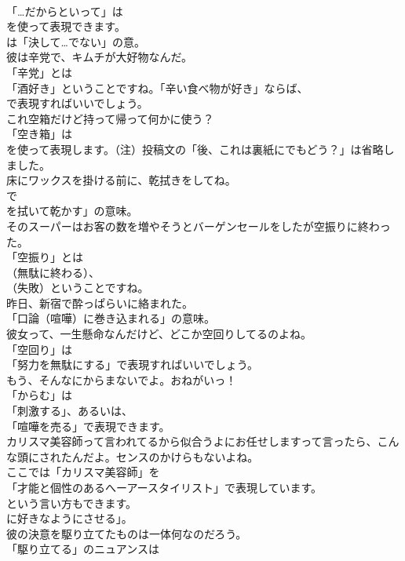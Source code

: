 \documentclass[8pt]{extreport}
\begin{document}
\begin{CJK}{UTF8}{min}
\\	「…だからといって」は 
\\	を使って表現できます。
\\	は「決して…でない」の意。	
\\	彼は辛党で、キムチが大好物なんだ。 
\\	「辛党」とは
\\	「酒好き」ということですね。「辛い食べ物が好き」ならば、
\\	で表現すればいいでしょう。	
\\	これ空箱だけど持って帰って何かに使う？ 
\\	「空き箱」は
\\	を使って表現します。（注）投稿文の「後、これは裏紙にでもどう？」は省略しました。	
\\	床にワックスを掛ける前に、乾拭きをしてね。 
\\	で
\\	を拭いて乾かす」の意味。	
\\	そのスーパーはお客の数を増やそうとバーゲンセールをしたが空振りに終わった。 
\\	「空振り」とは
\\	（無駄に終わる）、
\\	（失敗）ということですね。	
\\	昨日、新宿で酔っぱらいに絡まれた。 
\\	「口論（喧嘩）に巻き込まれる」の意味。	
\\	彼女って、一生懸命なんだけど、どこか空回りしてるのよね。 
\\	「空回り」は
\\	「努力を無駄にする」で表現すればいいでしょう。	
\\	もう、そんなにからまないでよ。おねがいっ！ 
\\	「からむ」は
\\	「刺激する」、あるいは、
\\	「喧嘩を売る」で表現できます。	
\\	カリスマ美容師って言われてるから似合うよにお任せしますって言ったら、こんな頭にされたんだよ。センスのかけらもないよね。 
\\	ここでは「カリスマ美容師」を
\\	「才能と個性のあるへーアースタイリスト」で表現しています。
\\	という言い方もできます。
\\	に好きなようにさせる」。	
\\	彼の決意を駆り立てたものは一体何なのだろう。 
\\	「駆り立てる」のニュアンスは 

\end{CJK}
\end{document}
